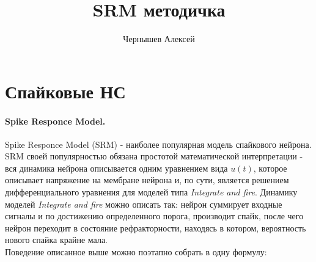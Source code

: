\documentclass[a4paper,10pt]{article}
\title{SRM методичка}
\author{Чернышев Алексей}
\begin{document}
\section*{Спайковые НС}
\paragraph{Spike Responce Model.} Spike Responce Model (SRM) - наиболее популярная модель спайкового нейрона. SRM своей популярностью обязана простотой математической интерпретации - вся динамика нейрона описывается одним уравнением вида $u(t)$, которое описывает напряжение на мембране нейрона и, по сути, является решением дифференциального уравнения для моделей типа \textit{Integrate and fire}. Динамику моделей \textit{Integrate and fire} можно описать так: нейрон суммирует входные сигналы и по достижению определенного порога, производит спайк, после чего нейрон переходит в состояние рефракторности, находясь в котором, вероятность нового спайка крайне мала.\\
\indent Поведение описанное выше можно поэтапно собрать в одну формулу: 
\end{document}
